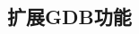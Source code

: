 \documentclass[class=book, crop=false]{standalone}
\begin{document}
\begin{CJK}{UTF8}{gbsn}

\chapter{扩展GDB功能}















\cleardoublepage

\end{CJK}
\end{document}

